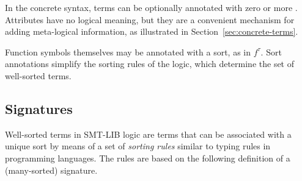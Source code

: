 In the concrete syntax, terms can be optionally annotated with zero or
more .  
Attributes have no logical meaning, 
but they are a convenient mechanism for adding meta-logical information,
as illustrated in Section~\ref{sec:concrete-terms}.


Function symbols themselves may be annotated with a sort, as in $f^\tau$.
Sort annotations simplify the sorting rules of the logic,
which determine the set of well-sorted terms.

\subsection{Signatures} \label{sec:signature}

Well-sorted terms in SMT-LIB logic are terms that can be associated
with a unique sort by means of a set of \emph{sorting rules}
similar to typing rules in programming languages.
The rules are based on the following definition of 
a (many-sorted) signature.

